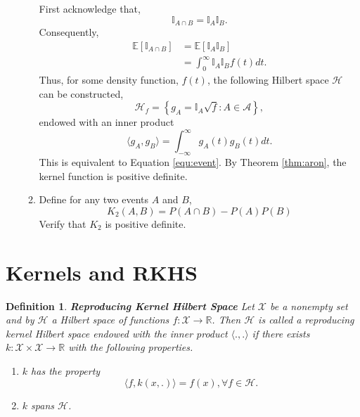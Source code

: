 \documentclass{article}[12pt]
\newtheorem{defn}{Definition}
\begin{document}
\begin{enumerate}
\begin{enumerate}
First acknowledge that,
\begin{equation}
\mathbb I _{A \cap B} = \mathbb{I}_A \mathbb{I}_B.
\end{equation}
Consequently, 
\begin{equation}\label{equ:event}
\begin{aligned} 
\mathbb E \left[ \mathbb I_{A \cap B} \right] &= \mathbb E \left[ \mathbb I_{A} \mathbb I_{B} \right]\\
&= \int_0^\infty \mathbb I_{A} \mathbb I_{B} f(t)
 dt. \end{aligned}
\end{equation}
Thus, for some density function, $f(t)$, the following Hilbert space $\mathcal H$ can be constructed,
\begin{equation}
\mathcal H_f = \left\{g_A = \mathbb I_A \sqrt{f} : A \in \mathcal A \right\},
\end{equation}
endowed with an inner product
\begin{equation}
\langle g_A, g_B\rangle = \int_{-\infty}^{\infty} g_A(t) g_B (t) dt.
\end{equation}
This is equivalent to Equation \ref{equ:event}. By Theorem \ref{thm:aron}, the kernel function is positive definite.


\item Define for any two events $A$ and $B$, 
$$K_2(A,B)=P(A \cap B)-P(A)P(B)$$
Verify that $K_2$ is positive definite. 


\end{enumerate}
\end{enumerate}
\section{Kernels and RKHS}

\begin{defn}{\textbf{Reproducing Kernel Hilbert Space}}
Let $\mathcal X$ be a nonempty set and by $\mathcal H$ a Hilbert space of functions $f: \mathcal X \rightarrow \mathbb R$. Then $\mathcal H$ is called a reproducing kernel Hilbert space endowed with the inner product $\langle.,.\rangle$ if there exists $k: \mathcal X \times \mathcal X \rightarrow \mathbb R$ with the following properties.
\begin{enumerate}
\item $k$ has the property 
\begin{equation}
\langle f, k(x, .) \rangle = f(x), \forall f \in \mathcal H.
\end{equation}
\item $k$ spans $\mathcal H$.
\end{enumerate}
\end{defn}
\end{document}
